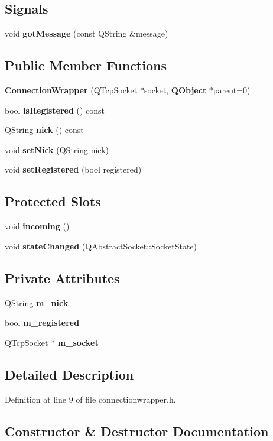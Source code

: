 \subsection*{Signals}
\begin{CompactItemize}
\item 
void {\bf gotMessage} (const QString \&message)
\end{CompactItemize}
\subsection*{Public Member Functions}
\begin{CompactItemize}
\item 
{\bf ConnectionWrapper} (QTcpSocket $\ast$socket, {\bf QObject} $\ast$parent=0)
\item 
bool {\bf isRegistered} () const 
\item 
QString {\bf nick} () const 
\item 
void {\bf setNick} (QString nick)
\item 
void {\bf setRegistered} (bool registered)
\end{CompactItemize}
\subsection*{Protected Slots}
\begin{CompactItemize}
\item 
void {\bf incoming} ()
\item 
void {\bf stateChanged} (QAbstractSocket::SocketState)
\end{CompactItemize}
\subsection*{Private Attributes}
\begin{CompactItemize}
\item 
QString {\bf m\_\-nick}
\item 
bool {\bf m\_\-registered}
\item 
QTcpSocket $\ast$ {\bf m\_\-socket}
\end{CompactItemize}


\subsection{Detailed Description}


Definition at line 9 of file connectionwrapper.h.

\subsection{Constructor \& Destructor Documentation}
